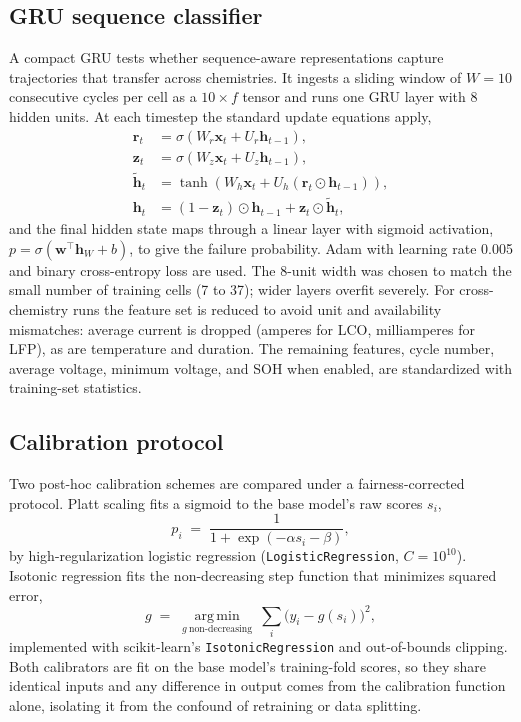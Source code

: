 \documentclass[journal]{IEEEtran}
\begin{document}
\subsection{GRU sequence classifier}
A compact GRU tests whether sequence-aware representations capture trajectories that transfer across chemistries. It ingests a sliding window of $W{=}10$ consecutive cycles per cell as a $10{\times}f$ tensor and runs one GRU layer with 8 hidden units. At each timestep the standard update equations apply,
\begin{equation}\label{eq:gru}
\begin{aligned}
\mathbf{r}_t &= \sigma(W_r\mathbf{x}_t + U_r\mathbf{h}_{t-1}),\\[2pt]
\mathbf{z}_t &= \sigma(W_z\mathbf{x}_t + U_z\mathbf{h}_{t-1}),\\[2pt]
\tilde{\mathbf{h}}_t &= \tanh(W_h\mathbf{x}_t + U_h(\mathbf{r}_t\odot\mathbf{h}_{t-1})),\\[2pt]
\mathbf{h}_t &= (1-\mathbf{z}_t)\odot\mathbf{h}_{t-1} + \mathbf{z}_t\odot\tilde{\mathbf{h}}_t,
\end{aligned}
\end{equation}
and the final hidden state maps through a linear layer with sigmoid activation, $p=\sigma(\mathbf{w}^{\top}\mathbf{h}_W + b)$, to give the failure probability. Adam with learning rate 0.005 and binary cross-entropy loss are used. The 8-unit width was chosen to match the small number of training cells (7 to 37); wider layers overfit severely. For cross-chemistry runs the feature set is reduced to avoid unit and availability mismatches: average current is dropped (amperes for LCO, milliamperes for LFP), as are temperature and duration. The remaining features, cycle number, average voltage, minimum voltage, and SOH when enabled, are standardized with training-set statistics.

\subsection{Calibration protocol}
Two post-hoc calibration schemes are compared under a fairness-corrected protocol. Platt scaling fits a sigmoid to the base model's raw scores $s_i$,
\begin{equation}\label{eq:platt}
p_i \;=\; \frac{1}{1+\exp(-\alpha s_i - \beta)},
\end{equation}
by high-regularization logistic regression (\texttt{LogisticRegression}, $C{=}10^{10}$). Isotonic regression fits the non-decreasing step function that minimizes squared error,
\begin{equation}\label{eq:iso}
g \;=\; \operatorname*{arg\,min}_{g\ \text{non-decreasing}}\ \sum_i \bigl(y_i - g(s_i)\bigr)^2,
\end{equation}
implemented with scikit-learn's \texttt{IsotonicRegression} and out-of-bounds clipping. Both calibrators are fit on the base model's training-fold scores, so they share identical inputs and any difference in output comes from the calibration function alone, isolating it from the confound of retraining or data splitting.
\end{document}
